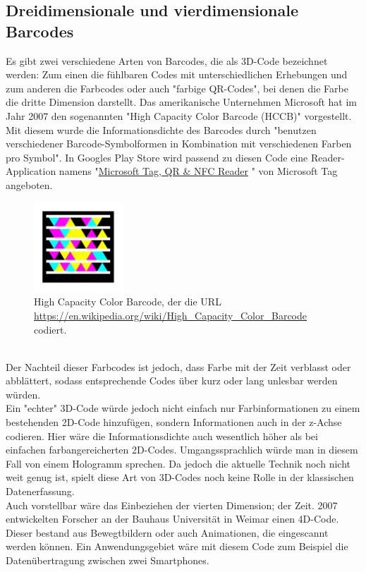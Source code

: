 \subsection{Dreidimensionale und vierdimensionale Barcodes}
Es gibt zwei verschiedene Arten von Barcodes, die als 3D-Code bezeichnet werden:
Zum einen die fühlbaren Codes mit unterschiedlichen Erhebungen und zum anderen die Farbcodes oder auch "farbige QR-Codes", bei denen die Farbe die dritte Dimension darstellt.
Das amerikanische Unternehmen Microsoft hat im Jahr 2007 den sogenannten "High Capacity Color Barcode (HCCB)" vorgestellt. Mit diesem wurde die Informationsdichte des Barcodes durch "benutzen verschiedener Barcode-Symbolformen in Kombination mit verschiedenen Farben pro Symbol"\cite{Paradiso2007}.
In Googles Play Store wird passend zu diesen Code eine Reader-Application namens "\href{https://play.google.com/store/apps/details?id=com.microsoft.tag.app.reader}{Microsoft Tag, QR \& NFC Reader} " von Microsoft Tag angeboten.
\begin{figure}[htbp]%
	\centering
	\includegraphics[width=0.3\textwidth]{Bilder/HCCB.png} 
	\vspace{-0.2cm}
	\caption[High Capacity Color Barcode]{High Capacity Color Barcode, der die URL \url{https://en.wikipedia.org/wiki/High_Capacity_Color_Barcode} codiert.\footnotemark}
	\label{fig:hccb}	
\end{figure}
~\\
Der Nachteil dieser Farbcodes ist jedoch, dass Farbe mit der Zeit verblasst oder abblättert, sodass entsprechende Codes über kurz oder lang unlesbar werden würden.\\
Ein "{}echter" 3D-Code würde jedoch nicht einfach nur Farbinformationen zu einem bestehenden 2D-Code hinzufügen, sondern Informationen auch in der z-Achse codieren. Hier wäre die Informationsdichte auch wesentlich höher als bei einfachen farbangereicherten 2D-Codes.  Umgangssprachlich würde man in diesem Fall von einem Hologramm sprechen. Da jedoch die aktuelle Technik noch nicht weit genug ist, spielt diese Art von 3D-Codes noch keine Rolle in der klassischen Datenerfassung. \cite{EtiscanGmbH2016}\\
Auch vorstellbar wäre das Einbeziehen der vierten Dimension; der Zeit. 2007 entwickelten Forscher an der Bauhaus Universität in Weimar einen 4D-Code. Dieser bestand aus Bewegtbildern oder auch Animationen, die eingescannt werden können. Ein Anwendungsgebiet wäre mit diesem Code zum Beispiel die Datenübertragung zwischen zwei Smartphones.\cite{Unglaube2015}

~\pagebreak
